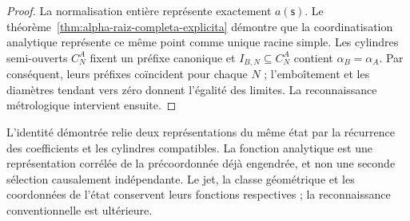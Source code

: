 \begin{proof}
La normalisation entière représente exactement \(a(\mathsf s)\). Le
théorème~\ref{thm:alpha-raiz-completa-explicita} démontre que la coordinatisation
analytique représente ce même point comme unique racine simple. Les
cylindres semi-ouverts \(C_N^A\) fixent un préfixe canonique et
\(I_{B,N}\subseteq C_N^A\) contient \(\alpha_B=\alpha_A\). Par conséquent, leurs
préfixes coïncident pour chaque \(N\) ; l’emboîtement et les diamètres tendant vers
zéro donnent l’égalité des limites. La reconnaissance
métrologique intervient ensuite.
\end{proof}

L'identité démontrée relie deux représentations du même état
par la récurrence des coefficients et les cylindres compatibles.
La fonction analytique est une représentation corrélée de la
précoordonnée déjà engendrée, et non une seconde sélection causalement
indépendante. Le jet, la classe géométrique et les coordonnées de l'état
conservent leurs fonctions respectives ; la reconnaissance conventionnelle est ultérieure.
